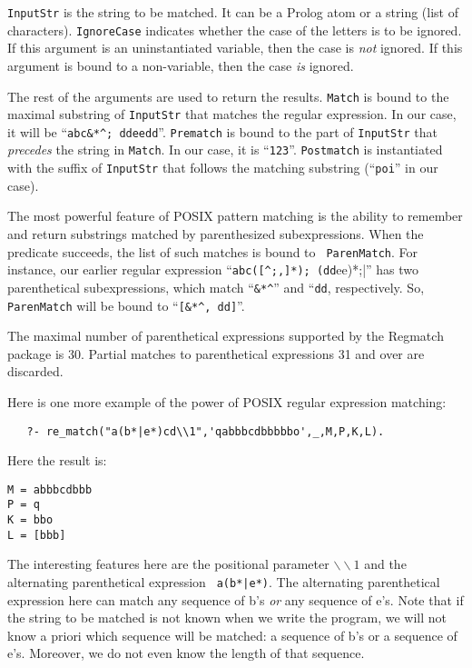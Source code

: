 {\tt InputStr} is the string to be matched. It can be a Prolog atom or a string
(list of characters). {\tt IgnoreCase} indicates whether
the case of the letters is to be ignored. If this argument is an
uninstantiated variable, then the case is \emph{not} ignored. If this
argument is bound to a non-variable, then the case \emph{is} ignored.

The rest of the arguments are used to return the results. {\tt Match} 
is bound to the maximal substring of {\tt InputStr} that matches the regular
expression. In our case, it will be ``\verb|abc&*^; ddeedd|''.
{\tt Prematch} is bound to the part of {\tt InputStr} that
\emph{precedes} the string in {\tt Match}. In our case, it is ``{\tt 123}''.
{\tt Postmatch} is
instantiated with the suffix of {\tt InputStr} that follows the matching
substring (``{\tt poi}'' in our case).

The most powerful feature of POSIX pattern matching is the ability to
remember and return substrings matched by parenthesized subexpressions.
When the predicate succeeds, the list of such matches is bound to {\tt
  ParenMatch}. For instance, our earlier regular expression 
  ``\verb|abc([^;,]*); (dd|ee)*;|'' has two parenthetical subexpressions, which
match ``\verb|&*^|'' and ``{\tt dd}, respectively. So, {\tt ParenMatch} will
be bound to ``\verb|[&*^, dd]|''.

The maximal number of parenthetical expressions supported by the Regmatch
package is 30. Partial matches to parenthetical expressions 31 and over are
discarded.

Here is one more example of the power of POSIX regular expression matching:
\begin{verbatim}
   ?- re_match("a(b*|e*)cd\\1",'qabbbcdbbbbbo',_,M,P,K,L).  
\end{verbatim}
Here the result is:
\begin{verbatim}
M = abbbcdbbb
P = q
K = bbo
L = [bbb]  
\end{verbatim}
The interesting features here are the positional parameter
$\backslash\backslash 1$ and the alternating parenthetical expression {\tt
a(b*|e*)}. The alternating parenthetical expression here can match any
sequence of b's \emph{or} any sequence of e's. Note that if the string to
be matched is not known when we write the program, we will not know a
priori which sequence will be matched: a sequence of b's or a sequence of e's.
Moreover, we do not even know the length of that sequence.

